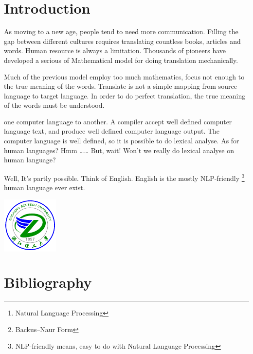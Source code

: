 \documentclass[a4paper]{article}
\title{\entitle}
\author{\enauthor}
\date{}
\begin{document}
\maketitle

\begin{abstract}
Real understanding of English text is required by much of tasks such as \emph{Machine Translation}, \emph{NLP\footnote{Natural Language Processing}}, etc. Building Concrete Syntax Tree \cite{cst} is the very first step of the understanding process. This thesis brings you one possible way of building Parse Tree of Natural Language -- English. It employs \emph{HMM based part-of-speech tagging} and \emph{BNF\footnote{Backus–Naur Form\protect\cite{BNF}} based Natural Language Parse Program}
\end{abstract}

\section{Introduction}

As moving to a new age, people tend to need more communication. Filling the gap
between different cultures requires translating countless books, articles and
words. Human resource is always a limitation. Thousands of pioneers have developed
a serious of Mathematical model for doing translation mechanically. 

Much of the previous model employ too much mathematics, focus not enough to the true meaning
of the words. Translate is not a simple mapping from source language to target language.
In order to do perfect translation, the true meaning of the words must be understood. 

one computer language to another. A compiler accept well defined computer language
text, and produce well defined computer language output. The computer language is well
defined, so it is possible to do lexical analyse. As for human languages? Hmm \ldots\ldots 
But, wait! Won't we really do lexical analyse on human language?

Well, It's partly possible. Think of English. English is the mostly
NLP-friendly \footnote{NLP-friendly means, easy to do with Natural Language Processing}
human language ever exist.

\includegraphics{zstu}

\section{Bibliography}



\end{document}
